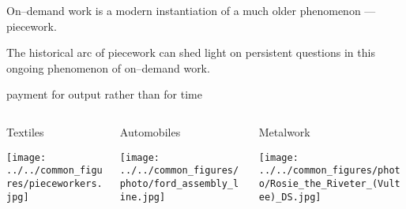 \documentclass[presentation]{subfiles}
\begin{document}
\begin{frame}[standout,label=takeaway]
  On--demand work is a modern instantiation of a much older phenomenon
  --- {piecework}.

  {\normalsize The historical arc of piecework
  can shed light on persistent questions
  in this ongoing phenomenon of on--demand work.}
\end{frame}


\begin{frame}[t]{payment for output rather than for time}
  \begin{columns}[T]
    \begin{column}{0.33\textwidth}
      \centering
      Textiles

      \vspace{0.5em}

      \texttt{[image: ../../common\_figures/pieceworkers.jpg]}
    \end{column}
    \begin{column}{0.33\textwidth}
      \centering
      Automobiles

      \vspace{0.5em}

      \texttt{[image: ../../common\_figures/photo/ford\_assembly\_line.jpg]}
    \end{column}
    \begin{column}{0.33\textwidth}
      \centering
      Metalwork

      \vspace{0.5em}

      \texttt{[image: ../../common\_figures/photo/Rosie\_the\_Riveter\_(Vultee)\_DS.jpg]}
    \end{column}
  \end{columns}
  \vspace*{7mm}
  
\end{frame}
\end{document}
